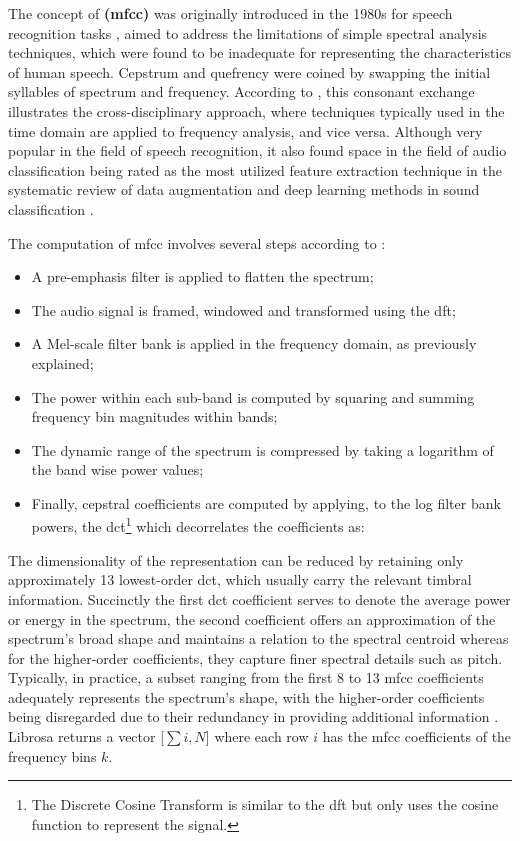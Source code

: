 The concept of \textbf{ (\gls{mfcc})} was originally introduced in the 1980s for speech recognition tasks \cite{DavisMermelstein1980}, aimed to address the limitations of simple spectral analysis techniques, which were found to be inadequate for representing the characteristics of human speech. Cepstrum and quefrency were coined by swapping the initial syllables of spectrum and frequency. According to \textcite{Oppenheim2004}, this consonant exchange illustrates the cross-disciplinary approach, where techniques typically used in the time domain are applied to frequency analysis, and vice versa. Although very popular in the field of speech recognition, it also found space in the field of audio classification being rated as the most utilized feature extraction technique in the systematic review of data augmentation and deep learning methods in sound classification \cite{Alli2022}.

The computation of \gls{mfcc} involves several steps according to \textcite{Klapuri2006}:

\begin{itemize}
    \item A pre-emphasis filter is applied to flatten the spectrum;
    \item The audio signal is framed, windowed and transformed using the \gls{dft};
    \item A Mel-scale filter bank is applied in the frequency domain, as previously explained;
    \item The power within each sub-band is computed by squaring and summing frequency bin magnitudes within bands;
    \item The dynamic range of the spectrum is compressed by taking a logarithm of the band wise power values;
    \item Finally, cepstral coefficients are computed by applying, to the log filter bank powers, the \gls{dct}\footnote{The Discrete Cosine Transform is similar to the \gls{dft} but only uses the cosine function to represent the signal.} which decorrelates the coefficients as:
\end{itemize}

The dimensionality of the representation can be reduced by retaining only approximately 13 lowest-order \gls{dct}, which usually carry the relevant timbral information. Succinctly the first \gls{dct} coefficient serves to denote the average power or energy in the spectrum, the second coefficient offers an approximation of the spectrum's broad shape and maintains a relation to the spectral centroid whereas for the higher-order coefficients, they capture finer spectral details such as pitch. Typically, in practice, a subset ranging from the first 8 to 13 \gls{mfcc} coefficients adequately represents the spectrum's shape, with the higher-order coefficients being disregarded due to their redundancy in providing additional information \cite{Abreha2014}. Librosa returns a vector [$\sum i, N$] where each row $i$ has the \gls{mfcc} coefficients of the frequency bins $k$.

